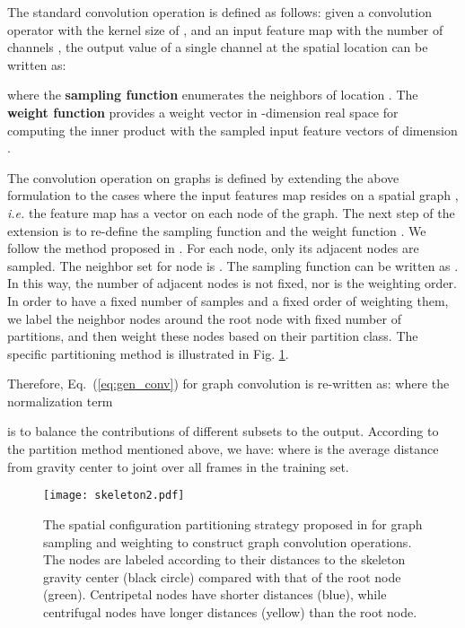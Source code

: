 \documentclass[10pt,twocolumn,letterpaper]{article}
\begin{document}
	The standard convolution operation is defined as follows:
	given a convolution operator with the kernel size of , and an input feature map  with the number of channels , the output value of a single channel at the spatial location  can be written as:
\vspace{-3pt}
	
where the \textbf{sampling function}  enumerates the neighbors of location .
The \textbf{weight function}  provides a weight vector in -dimension real space for computing the inner product with the sampled input feature vectors of dimension .


	The convolution operation on graphs is defined by extending the above formulation to the cases where the input features map resides on a spatial graph , \emph{i.e.} the feature map  has a vector on each node of the graph.
	The next step of the extension is to re-define the sampling function  and the weight function . We follow the method proposed in  \cite{stgcn2018aaai}.
	For each node, only its adjacent nodes are sampled. The neighbor set for node  is .
	The sampling function  can be written as .
	In this way, the number of adjacent nodes is not fixed, nor is the weighting order.
	In order to have a fixed number of samples and a fixed order of weighting them, we label the neighbor nodes around the root node with fixed number of partitions, and then weight these nodes based on their partition class. 
	The specific partitioning method is illustrated in Fig. \ref{fig:skeleton}.


	Therefore, Eq.~(\ref{eq:gen_conv})  for graph convolution is re-written as:
	\vspace{-3pt}
	where the normalization term 
	
	is to balance the contributions of different subsets to the output.
	According to the partition method mentioned above, we have:
	\vspace{-3pt}
	where  is the average distance from gravity center to joint  over all frames in the training set.
	
	\begin{figure}
		\vspace{-.25in}
		\centering
		\texttt{[image: skeleton2.pdf]}
		\caption{The spatial configuration partitioning strategy proposed in \cite{stgcn2018aaai} for graph sampling and weighting to construct graph convolution operations. The nodes are labeled according to their distances to the skeleton gravity center (black circle) compared with that of the root node (green). Centripetal nodes have shorter distances (blue), while centrifugal nodes have longer distances (yellow) than the root node.} 
		\label{fig:skeleton}
		\vspace{-.15in}
	\end{figure}
	
\end{document}
